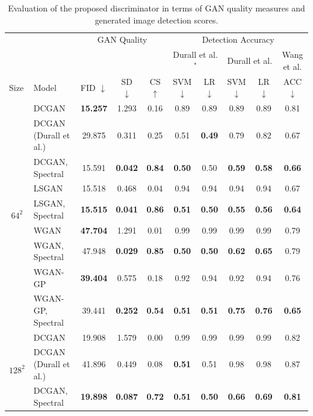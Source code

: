 \documentclass[letterpaper]{article} %
\begin{document}
\begin{table}
    \caption{Evaluation of the proposed discriminator in terms of GAN quality measures and generated image detection scores. %
    }
    \label{tab1}
    \small
    \centering
    \begin{tabular}{l|l|ccc|ccccc}
        \toprule
        &&\multicolumn{3}{c}{GAN Quality}&\multicolumn{5}{c}{Detection Accuracy}\\
         &&&&&\multicolumn{2}{c}{Durall et al.$^*$}
        &\multicolumn{2}{c}{Durall et al.}&Wang et al.\\
        Size & Model & FID $\downarrow$ & SD $\downarrow$ & CS $\uparrow$ & SVM $\downarrow$ & LR $\downarrow$ & SVM $\downarrow$ & LR $\downarrow$ & ACC $\downarrow$ \\
        \midrule
\multicolumn{1}{c|}{\multirow{9}{*}{$64^2$}}
& DCGAN & {\bf 15.257} & 1.293 & 0.16& 0.89&0.89& 0.89&0.89  &0.81\\
& DCGAN (Durall et al.)& 29.875 & 0.311 & 0.25 & 0.51&{\bf 0.49}& 0.79&0.82&0.67 \\
 & DCGAN, Spectral & 15.591 & {\bf 0.042} & {\bf 0.84}  &{\bf 0.50} &0.50 &{\bf 0.59}&{\bf 0.58}&{\bf 0.66}\\ %
 & LSGAN & 15.518 & 0.468 & 0.04 & 0.94 & 0.94& 0.94 & 0.94&0.67\\
 & LSGAN, Spectral & {\bf 15.515} & {\bf 0.041} & {\bf 0.86}  & {\bf 0.51} & {\bf 0.50} & {\bf 0.55}&{\bf 0.56}&{\bf 0.64}\\ %
 & WGAN & {\bf 47.704} & 1.291 & 0.01 & 0.99&0.99&0.99&0.99&0.79\\
 & WGAN, Spectral & 47.948 & {\bf 0.029} & {\bf 0.85} & {\bf 0.50}&{\bf 0.50} & {\bf 0.62}&{\bf 0.65}&0.79\\ %
 & WGAN-GP & {\bf 39.404} & 0.575 & 0.18 & 0.92&0.94&0.92&0.94&0.76\\
 & WGAN-GP, Spectral & 39.441 & {\bf 0.252} & {\bf 0.54} &{\bf 0.51}&{\bf 0.51}&{\bf 0.75}&{\bf 0.76}&{\bf 0.65}\\ \midrule
\multicolumn{1}{c|}{\multirow{9}{*}{$128^2$}} & DCGAN & 19.908 & 1.579 & 0.00  & 0.99 & 0.99 &0.99&0.99 &0.82\\
& DCGAN (Durall et al.) & 41.896 & 0.449 & 0.08 & \bf{0.51} & 0.51 & 0.98 & 0.98 & 0.87\\
 & DCGAN, Spectral & {\bf 19.898} & {\bf 0.087} & {\bf 0.72} & {\bf 0.51}&{\bf 0.50}&{\bf 0.66}&{\bf 0.69}&{\bf 0.81} \\ %

\end{tabular}
\end{table}
\end{document}
